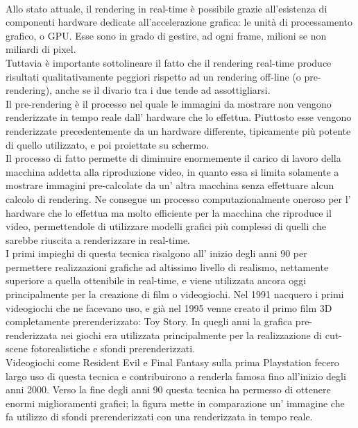\\ 
Allo stato attuale, il rendering in real-time è possibile grazie all’esistenza di componenti hardware dedicate all’accelerazione grafica: le unità di processamento grafico, o GPU. 
Esse sono in grado di gestire, ad ogni frame, milioni se non miliardi di pixel. 
\\
Tuttavia è importante sottolineare il fatto che il rendering real-time produce risultati qualitativamente peggiori rispetto ad un rendering off-line (o pre-rendering), anche se il divario tra i due tende ad assottigliarsi. 
\\

Il pre-rendering è il processo nel quale le immagini da mostrare non vengono renderizzate in tempo reale dall’ hardware che lo effettua. Piuttosto esse vengono renderizzate precedentemente da un hardware differente, tipicamente più potente di quello utilizzato, e poi proiettate su schermo.
\\
Il processo di fatto permette di diminuire enormemente il carico di lavoro della macchina addetta alla riproduzione video, in quanto essa si limita solamente a mostrare immagini pre-calcolate da un’ altra macchina senza effettuare alcun calcolo di rendering.
Ne consegue un processo computazionalmente oneroso per l’ hardware che lo effettua ma molto efficiente per la macchina che riproduce il video, permettendole di utilizzare modelli grafici più complessi di quelli che sarebbe riuscita a renderizzare in real-time.
\\
I primi impieghi di questa tecnica risalgono all’ inizio degli anni 90 per permettere realizzazioni grafiche ad altissimo livello di realismo, nettamente superiore a quella ottenibile in real-time, e viene utilizzata ancora oggi principalmente per la creazione di film o videogiochi.
Nel 1991 nacquero i primi videogiochi che ne facevano uso, e già nel 1995 venne creato il primo film 3D completamente prerenderizzato: Toy Story.
In quegli anni la grafica pre-renderizzata nei giochi era utilizzata principalmente per la realizzazione di cut-scene fotorealistiche e sfondi prerenderizzati.
\\
Videogiochi come Resident Evil e Final Fantasy sulla prima Playstation fecero largo uso di questa tecnica e contribuirono a renderla famosa fino all’inizio degli anni 2000. 
Verso la fine degli anni 90 questa tecnica ha permesso di ottenere enormi miglioramenti grafici; la figura mette in comparazione un’ immagine che fa utilizzo di sfondi prerenderizzati con una renderizzata in tempo reale.
\\
